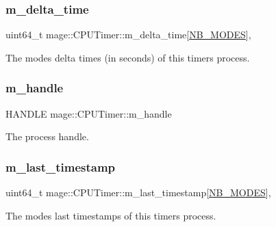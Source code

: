 \subsubsection{\texorpdfstring{m\+\_\+delta\+\_\+time}{m\_delta\_time}}
{\footnotesize\ttfamily uint64\+\_\+t mage\+::\+C\+P\+U\+Timer\+::m\+\_\+delta\+\_\+time\mbox{[}\hyperlink{classmage_1_1_c_p_u_timer_a5adc0497956723a35534dfeb66fa7789ab63e6023ec0bea89568ebb2b98728b77}{N\+B\+\_\+\+M\+O\+D\+ES}\mbox{]}\hspace{0.3cm}{\ttfamily [mutable]}, {\ttfamily [private]}}

The modes\textquotesingle{} delta times (in seconds) of this timer\textquotesingle{}s process. \hypertarget{classmage_1_1_c_p_u_timer_a95b8ac18c050ed25293c8a923087369a}{}\label{classmage_1_1_c_p_u_timer_a95b8ac18c050ed25293c8a923087369a} 
\subsubsection{\texorpdfstring{m\+\_\+handle}{m\_handle}}
{\footnotesize\ttfamily H\+A\+N\+D\+LE mage\+::\+C\+P\+U\+Timer\+::m\+\_\+handle\hspace{0.3cm}{\ttfamily [private]}}

The process handle. \hypertarget{classmage_1_1_c_p_u_timer_a6ff1dc5a56461359a699ba8b17d636a8}{}\label{classmage_1_1_c_p_u_timer_a6ff1dc5a56461359a699ba8b17d636a8} 
\subsubsection{\texorpdfstring{m\+\_\+last\+\_\+timestamp}{m\_last\_timestamp}}
{\footnotesize\ttfamily uint64\+\_\+t mage\+::\+C\+P\+U\+Timer\+::m\+\_\+last\+\_\+timestamp\mbox{[}\hyperlink{classmage_1_1_c_p_u_timer_a5adc0497956723a35534dfeb66fa7789ab63e6023ec0bea89568ebb2b98728b77}{N\+B\+\_\+\+M\+O\+D\+ES}\mbox{]}\hspace{0.3cm}{\ttfamily [mutable]}, {\ttfamily [private]}}

The modes\textquotesingle{} last timestamps of this timer\textquotesingle{}s process. \hypertarget{classmage_1_1_c_p_u_timer_ac5fdb38a70c74815231b5efd8d746be1}{}\label{classmage_1_1_c_p_u_timer_ac5fdb38a70c74815231b5efd8d746be1} 
